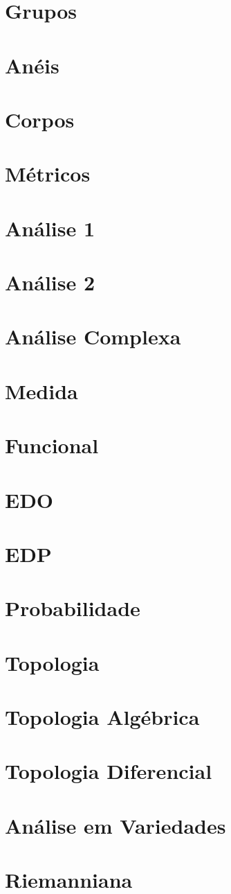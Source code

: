 \documentclass{article}
\begin{document}
\section{Grupos}
\section{Anéis}
\section{Corpos}
\section{Métricos}
\section{Análise 1}
\section{Análise 2}
\section{Análise Complexa}
\section{Medida}
\section{Funcional}
\section{EDO}
\section{EDP}
\section{Probabilidade}
\section{Topologia}
\section{Topologia Algébrica}
\section{Topologia Diferencial}
\section{Análise em Variedades}
\section{Riemanniana}
\end{document}
